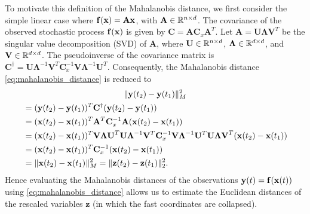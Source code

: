 To motivate this definition of the Mahalanobis distance, we first consider the simple linear case where $\mathbf{f} (\mathbf{x}) = \mathbf{A} \mathbf{x}$, with $\mathbf{A} \in \mathbb{R}^{n \times d}$.
%
The covariance of the observed stochastic process $\mathbf{f} (\mathbf{x})$ is given by $\mathbf{C}=\mathbf{AC}_x\mathbf{A}^T$.
%
Let $\mathbf{A}= \mathbf{U} \mathbf{\Lambda} \mathbf{V}^T$ be the singular value decomposition (SVD) of $\mathbf{A}$, where $\mathbf{U} \in \mathbb{R}^{n \times d}$, $\mathbf{\Lambda} \in \mathbb{R}^{d \times d}$, and $\mathbf{V} \in \mathbb{R}^{d \times d}$.
%
The pseudoinverse of the covariance matrix is $\mathbf{C}^{\dagger} = \mathbf{U} \mathbf{\Lambda}^{-1} \mathbf{V}^T \mathbf{C}_x^{-1} \mathbf{V \Lambda} ^{-1} \mathbf{U}^T$. Consequently, the Mahalanobis distance \eqref{eq:mahalanobis_distance} is reduced to
\begin{multline}
\| \mathbf{y}(t_2) - \mathbf{y}(t_1) \|^2_M \\
\begin{aligned}
&= (\mathbf{y}(t_2) - \mathbf{y}(t_1))^T  \mathbf{C}^{\dagger} (\mathbf{y}(t_2) - \mathbf{y}(t_1)) \\
 &= (\mathbf{x}(t_2) - \mathbf{x}(t_1))^T \mathbf{A}^T \mathbf{C}_x^{-1} \mathbf{A} (\mathbf{x}(t_2) - \mathbf{x}(t_1)) \\
 &= (\mathbf{x}(t_2) - \mathbf{x}(t_1))^T \mathbf{V \Lambda U}^T \mathbf{ U \Lambda}^{-1} \mathbf{V}^T \mathbf{C}_x^{-1} \mathbf{V \Lambda} ^{-1} \mathbf{U}^T \mathbf{U \Lambda V}^T (\mathbf{x}(t_2) - \mathbf{x}(t_1)) \\
 &= (\mathbf{x}(t_2) - \mathbf{x}(t_1))^T \mathbf{C}_x^{-1}  (\mathbf{x}(t_2) - \mathbf{x}(t_1)) \\
 &= \| \mathbf{x}(t_2) - \mathbf{x}(t_1) \|^2_M =  \| \mathbf{z}(t_2) - \mathbf{z}(t_1) \|^2_2 .
\end{aligned}
\end{multline}
Hence evaluating the Mahalanobis distances of the observations $\mathbf{y}(t) = \mathbf{f}(\mathbf{x}(t))$ using \eqref{eq:mahalanobis_distance} allows us to estimate the Euclidean distances of the rescaled variables $\mathbf{z}$ (in which the fast coordinates are collapsed).


